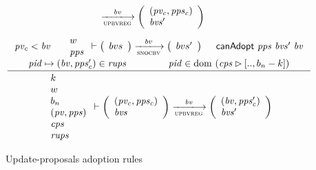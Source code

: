 \begin{figure}[htb]
\begin{equation}
{{      }
      \trans{upbvreg}{\var{bv}}
      {
        \left(
          \begin{array}{l}
            (\var{pv_c}, \var{pps_c})\\
            \var{bvs'}
          \end{array}
        \right)
      }
    }
  \end{equation}
  \nextdef
  \begin{equation}
    \label{eq:rule:up-adoption}
    \inference
    {
      \var{pv_c} < \var{bv}
      &
      {
        \begin{array}{l}
          w\\
          \var{pps}
        \end{array}
      }
      \vdash
      {
        \left(
          \begin{array}{l}
            bvs
          \end{array}
        \right)
      }
      \trans{snocbv}{bv}
      {
        \left(
          \begin{array}{l}
            bvs'
          \end{array}
        \right)
      }
      &
      \fun{canAdopt}~\var{pps}~\var{bvs'}~\var{bv}\\
      \var{pid} \mapsto (\var{bv}, \var{pps_c'}) \in \var{rups}
      & \var{pid} \in \dom~(\var{cps} \restrictrange [.., b_n - k])\\
    }
    {
      {
        \begin{array}{l}
          k\\
          w\\
          b_n\\
          (\var{pv}, \var{pps})\\
          \var{cps}\\
          \var{rups}
        \end{array}
      }
      \vdash
      {
        \left(
          \begin{array}{l}
            (\var{pv_c}, \var{pps_c})\\
            \var{bvs}
          \end{array}
        \right)
      }
      \trans{upbvreg}{\var{bv}}
      {
        \left(
          \begin{array}{l}
            (\var{bv}, \var{pps_c'})\\
            \var{bvs'}
          \end{array}
        \right)
      }
    }
  \end{equation}
  \caption{Update-proposals adoption rules}
  \label{fig:rules:up-bv-reg}
\end{figure}

